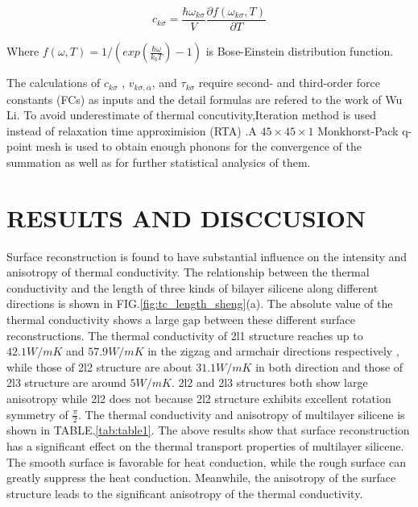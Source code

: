 \documentclass[%
 reprint,
 amsmath,amssymb,
 aps,
 prb,
]{revtex4-1}
\begin{document}
\begin{equation}
  c_{k \sigma}=\frac{\hbar \omega_{k \sigma} }{V} \frac{\partial f(\omega_{k \sigma},T)}{\partial T} \label{eq:cv}
\end{equation}

Where $ f(\omega,T)=1/(exp(\frac{\hbar \omega}{k_b T})-1)$ is Bose-Einstein distribution function.

The calculations of $c_{k\sigma}$ , $v_{k\sigma,\alpha}$, and $\tau_{k\sigma}$ require second- and third-order force constants (FCs) as inputs and the detail formulas are refered to the work of  Wu Li\cite{Li2014}. To avoid underestimate of thermal concutivity,Iteration method is used instead of relaxation time approximision (RTA) .A $45\times 45 \times 1$ Monkhorst-Pack q-point mesh is used to obtain enough phonons for the convergence of the summation as well as for further statistical analysics of them.



\section{RESULTS AND DISCCUSION}

Surface reconstruction is found to have substantial influence on the intensity and anisotropy of thermal conductivity. The relationship between the thermal conductivity  and the length of three kinds of bilayer silicene along different directions is shown in FIG.\ref{fig:tc_length_sheng}(a). The absolute value of the thermal conductivity shows a large gap between these different surface reconstructions. The thermal conductivity of 2l1 structure reaches up to $42.1W/mK$ and $57.9W/mK$ in the zigzag and armchair directions respectively , while those of 2l2 structure are about $31.1W/mK$ in both direction and those of 2l3 structure are around $5W/mK$. 2l2 and 2l3 structures both show large anisotropy while 2l2 does not because 2l2 structure exhibits excellent rotation symmetry of $\frac{\pi}{2}$. The thermal conductivity and anisotropy of multilayer silicene is shown in TABLE.\ref{tab:table1}.   The above results show that surface reconstruction has a significant effect on the thermal transport properties of multilayer silicene. The smooth surface is favorable for heat conduction, while the rough surface can greatly suppress the heat conduction. Meanwhile, the anisotropy of the surface structure leads to the significant anisotropy of the thermal conductivity.
\end{document}
